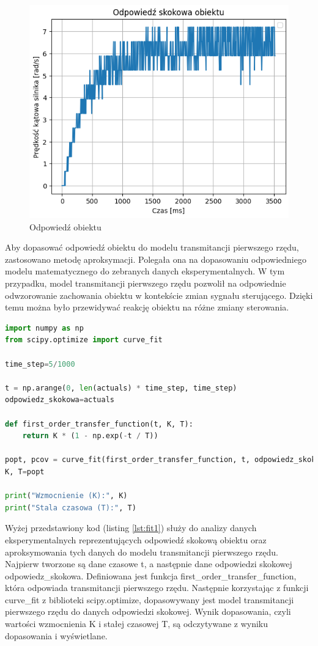 \documentclass[12pt,twoside]{article}
\begin{document}
\begin{figure}[ht]%
 \centering%
 \includegraphics[width=12cm]{figures/PID/noreg.png}%
 \caption{Odpowiedź obiektu}%
 \label{Fig:noreg}%
\end{figure}

Aby dopasować odpowiedź obiektu do modelu transmitancji pierwszego rzędu, zastosowano metodę aproksymacji. Polegała ona na dopasowaniu odpowiedniego modelu matematycznego do zebranych danych eksperymentalnych. W tym przypadku, model transmitancji pierwszego rzędu pozwolił na odpowiednie odwzorowanie zachowania obiektu w kontekście zmian sygnału sterującego. Dzięki temu można było przewidywać reakcję obiektu na różne zmiany sterowania.

\begin{lstlisting}[language=Python, caption=Kod aproksymujący odpowiedź, label={lst:fit1}]
import numpy as np
from scipy.optimize import curve_fit

time_step=5/1000
  
t = np.arange(0, len(actuals) * time_step, time_step)
odpowiedz_skokowa=actuals 

def first_order_transfer_function(t, K, T):
    return K * (1 - np.exp(-t / T))

popt, pcov = curve_fit(first_order_transfer_function, t, odpowiedz_skokowa)
K, T=popt

print("Wzmocnienie (K):", K)
print("Stala czasowa (T):", T)
\end{lstlisting}

Wyżej przedstawiony kod (listing \ref{lst:fit1}) służy do analizy danych eksperymentalnych reprezentujących odpowiedź skokową obiektu oraz aproksymowania tych danych do modelu transmitancji pierwszego rzędu. Najpierw tworzone są dane czasowe t, a następnie dane odpowiedzi skokowej odpowiedz\_skokowa. Definiowana jest funkcja first\_order\_transfer\_function, która odpowiada transmitancji pierwszego rzędu. Następnie korzystając z funkcji curve\_fit z biblioteki scipy.optimize, dopasowywany jest model transmitancji pierwszego rzędu do danych odpowiedzi skokowej. Wynik dopasowania, czyli wartości wzmocnienia K i stałej czasowej T, są odczytywane z wyniku dopasowania i wyświetlane.
\end{document}
